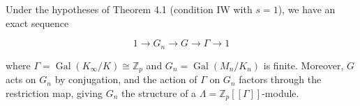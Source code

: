 Under the hypotheses of Theorem 4.1 (condition IW with $s = 1$), we have an exact sequence

$$
1 \to G_n \to G \to \Gamma \to 1
$$

where $\Gamma = \operatorname{Gal}(K_\infty/K) \cong \mathbb{Z}_p$ and $G_n = \operatorname{Gal}(M_n/K_n)$ is finite. Moreover, $G$ acts on $G_n$ by conjugation, and the action of $\Gamma$ on $G_n$ factors through the restriction map, giving $G_n$ the structure of a $\Lambda = \mathbb{Z}_p[[\Gamma]]$-module.
